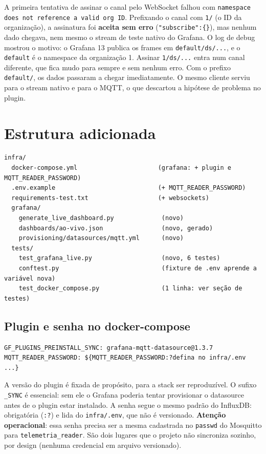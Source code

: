 \documentclass[11pt,a4paper]{article}
\begin{document}
A primeira tentativa de assinar o canal pelo WebSocket falhou com \texttt{namespace does not reference a valid org ID}. Prefixando o canal com \texttt{1/} (o ID da organização), a assinatura foi \textbf{aceita sem erro} (\texttt{"subscribe":\{\}}), mas nenhum dado chegava, nem mesmo o stream de teste nativo do Grafana. O log de debug mostrou o motivo: o Grafana 13 publica os frames em \texttt{default/ds/...}, e o \texttt{default} é o namespace da organização 1. Assinar \texttt{1/ds/...} entra num canal diferente, que fica mudo para sempre e sem nenhum erro. Com o prefixo \texttt{default/}, os dados passaram a chegar imediatamente. O mesmo cliente serviu para o stream nativo e para o MQTT, o que descartou a hipótese de problema no plugin.

\section{Estrutura adicionada}

\begin{lstlisting}[caption={Arquivos novos e alterados}]
infra/
  docker-compose.yml                      (grafana: + plugin e MQTT_READER_PASSWORD)
  .env.example                            (+ MQTT_READER_PASSWORD)
  requirements-test.txt                   (+ websockets)
  grafana/
    generate_live_dashboard.py             (novo)
    dashboards/ao-vivo.json                (novo, gerado)
    provisioning/datasources/mqtt.yml      (novo)
  tests/
    test_grafana_live.py                   (novo, 6 testes)
    conftest.py                            (fixture de .env aprende a variável nova)
    test_docker_compose.py                 (1 linha: ver seção de testes)
\end{lstlisting}

\subsection{Plugin e senha no docker-compose}

\begin{lstlisting}[caption={Trecho novo do serviço grafana}]
GF_PLUGINS_PREINSTALL_SYNC: grafana-mqtt-datasource@1.3.7
MQTT_READER_PASSWORD: ${MQTT_READER_PASSWORD:?defina no infra/.env ...}
\end{lstlisting}

A versão do plugin é fixada de propósito, para a stack ser reproduzível. O sufixo \texttt{\_SYNC} é essencial: sem ele o Grafana poderia tentar provisionar o datasource antes de o plugin estar instalado. A senha segue o mesmo padrão do InfluxDB: obrigatória (\texttt{:?}) e lida do \texttt{infra/.env}, que não é versionado. \textbf{Atenção operacional}: essa senha precisa ser a mesma cadastrada no \texttt{passwd} do Mosquitto para \texttt{telemetria\_reader}. São dois lugares que o projeto não sincroniza sozinho, por design (nenhuma credencial em arquivo versionado).
\end{document}
